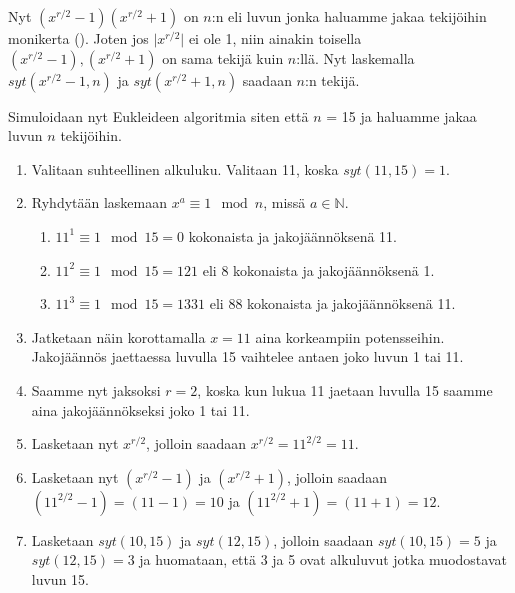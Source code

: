 Nyt $(x^{r/2} - 1)(x^{r/2} + 1)$ on $n$:n eli luvun jonka haluamme jakaa tekijöihin monikerta (\cite{hayward2008quantum}). Joten jos $\lvert x^{r/2} \rvert$ ei ole 1, niin ainakin toisella $(x^{r/2} - 1), (x^{r/2} + 1)$ on sama tekijä kuin $n$:llä. Nyt laskemalla $syt(x^{r/2} - 1, n)$ ja $syt(x^{r/2} + 1, n)$ saadaan $n$:n tekijä.

Simuloidaan nyt Eukleideen algoritmia siten että $n$ = 15 ja haluamme jakaa luvun $n$ tekijöihin.
\begin{enumerate}
    \item Valitaan suhteellinen alkuluku. Valitaan 11, koska $syt(11,15) = 1$.
    
    \item Ryhdytään laskemaan $x^{a} \equiv 1 \mod n$, missä $a \in \mathbb{N}$.
    
    \begin{enumerate}
    
        \item $11^{1} \equiv 1 \mod 15 = 0$ kokonaista ja jakojäännöksenä 11.
        
        \item $11^{2} \equiv 1 \mod 15 = 121$ eli 8 kokonaista ja jakojäännöksenä 1.
        
        \item $11^{3} \equiv 1 \mod 15 = 1331$ eli 88 kokonaista ja jakojäännöksenä 11.
    \end{enumerate}
    
    \item Jatketaan näin korottamalla $x = 11$ aina korkeampiin potensseihin. Jakojäännös jaettaessa luvulla 15 vaihtelee antaen joko luvun 1 tai 11.
    
    \item Saamme nyt jaksoksi $r = 2$, koska kun lukua 11 jaetaan luvulla 15 saamme aina jakojäännökseksi joko 1 tai 11.
    
    \item Lasketaan nyt $x^{r/2}$, jolloin saadaan $x^{r/2} = 11^{2/2} = 11$.
    
    \item Lasketaan nyt $(x^{r/2}-1)$ ja $(x^{r/2}+1)$, jolloin saadaan $(11^{2/2} - 1) = (11 - 1) = 10$ ja $(11^{2/2} + 1) = (11 + 1) = 12$.
    
    \item Lasketaan $syt(10,15)$ ja $syt(12,15)$, jolloin saadaan $syt(10,15) = 5$ ja $syt(12,15) = 3$ ja huomataan, että 3 ja 5 ovat alkuluvut jotka muodostavat luvun 15.
    
\end{enumerate}

